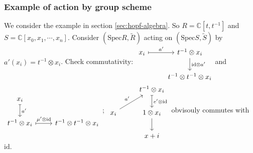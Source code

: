 \documentclass{article}
\theoremstyle{definition}
\newcommand{\Spec}{\mathrm{Spec}}
\newcommand{\ssheaf}[1]{\widetilde{#1}}
\newcommand{\tensor}[2]{#1\otimes#2}
\newcommand{\id}{\mathrm{id}}
\newcommand{\sr}[1]{(\Spec{#1},\ssheaf{#1})}
\begin{document}
\subsubsection{Example of action by group scheme}
We consider the example in section \ref{sec:hopf-algebra}. So $R = \mathbb C[t, t^{-1}]$ and $S=\mathbb C[x_0, x_1,\cdots,x_n]$. Consider $\sr R$ acting on $\sr S$ by $a'(x_i)=\tensor{t^{-1}}{x_i}$. Check commutativity:
$
\begin{tikzcd}
  {x_i}\arrow[r, mapsto, "a'"] & {\tensor{t^{-1}}{x_i}} \arrow[d, "{\tensor\id{a'}}"] \\
  & {\tensor{t^{-1}}{\tensor{t^{-1}}{x_i}}}
\end{tikzcd}
$and $
\begin{tikzcd}
  {x_i}\arrow[d, mapsto, "a'"] \\
  {\tensor{t^{-1}}{x_i}}\arrow[r, mapsto, "{\tensor{\mu'}\id}"] & {\tensor{t^{-1}}{\tensor{t^{-1}}{x_i}}}
\end{tikzcd}
$; $
\begin{tikzcd}
  & {\tensor{t^{-1}}{x_i}}\arrow[d, mapsto, "\tensor{e'}\id"] \\
  {x_i} \arrow[ru, "a'"] & {\tensor1{x_i}} \arrow[d]\\
  & {x+i}
\end{tikzcd}
$ obvisouly commutes with $\id$.
\end{document}
